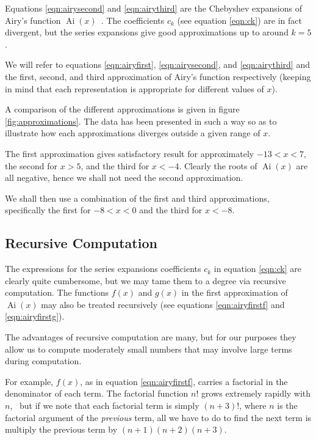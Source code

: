 \documentclass[]{article}
\newcommand{\Ai}[1]{\ensuremath{\operatorname{Ai}({#1})}}
\begin{document}
Equations \ref{eqn:airysecond} and \ref{eqn:airythird} are the Chebyshev expansions of Airy's function $\Ai{x}$~\cite{ref:agil}. The coefficients $c_{k}$ (see equation \ref{eqn:ck}) are in fact divergent, but the series expansions give good approximations up to around $k = 5$.

We will refer to equations \ref{eqn:airyfirst}, \ref{eqn:airysecond}, and \ref{eqn:airythird} and the first, second, and third approximation of Airy's function respectively (keeping in mind that each representation is appropriate for different values of $x$).

A comparison of the different approximations is given in figure \ref{fig:approximations}. The data has been presented in such a way so as to illustrate how each approximations diverges outside a given range of $x$.

The first approximation gives satisfactory result for approximately $-13 < x < 7$, the second for $x > 5$, and the third for $x < -4$. Clearly the roots of \Ai{x} are all negative, hence we shall not need the second approximation.

We shall then use a combination of the first and third approximations, specifically the first for $-8 < x < 0$ and the third for $x < -8$.

\subsection{Recursive Computation}\label{ssec:recursion}

The expressions for the series expansions coefficients $c_{k}$ in equation \ref{eqn:ck} are clearly quite cumbersome, but we may tame them to a degree via recursive computation. The functions $f(x)$ and $g(x)$ in the first approximation of $\Ai{x}$ may also be treated recursively (see equations \ref{eqn:airyfirstf} and \ref{eqn:airyfirstg}).

The advantages of recursive computation are many, but for our purposes they allow us to compute moderately small numbers that may involve large terms during computation.

For example, $f(x)$, as in equation \ref{eqn:airyfirstf}, carries a factorial in the denominator of each term. The factorial function $n!$ grows extremely rapidly with $n$,\footnotemark~ but if we note that each factorial term is simply $(n+3)!$, where $n$ is the factorial argument of the \emph{previous} term, all we have to do to find the next term is multiply the previous term by $(n+1)(n+2)(n+3)$.
\end{document}

